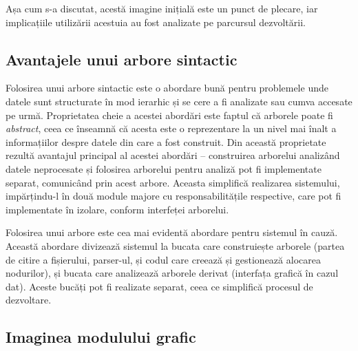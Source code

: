 \documentclass[a4paper,12pt]{report}
\begin{document}
Așa cum s-a discutat, acestă imagine inițială este un punct de plecare,
iar implicațiile utilizării acestuia au fost analizate pe parcursul dezvoltării.

\subsection{Avantajele unui arbore sintactic}

Folosirea unui arbore sintactic este o abordare bună pentru problemele 
unde datele sunt structurate în mod ierarhic și se cere a fi analizate sau cumva accesate pe urmă.
Proprietatea cheie a acestei abordări este faptul că arborele poate fi \textit{abstract},
ceea ce înseamnă că acesta este o reprezentare la un nivel mai înalt a informațiilor despre datele
din care a fost construit.
Din această proprietate rezultă avantajul principal al acestei abordări --
construirea arborelui analizând datele neprocesate și folosirea arborelui
pentru analiză pot fi implementate separat, comunicând prin acest arbore.
Aceasta simplifică realizarea sistemului, impărțindu-l în două module majore cu responsabilitățile respective,
care pot fi implementate în izolare, conform interfeței arborelui.

Folosirea unui arbore este cea mai evidentă abordare pentru sistemul în cauză.
Această abordare divizează sistemul la bucata care construiește arborele
(partea de citire a fișierului, parser-ul, și codul care creează și gestionează alocarea nodurilor),
și bucata care analizează arborele derivat (interfața grafică în cazul dat).
Aceste bucăți pot fi realizate separat, ceea ce simplifică procesul de dezvoltare.

\subsection{Imaginea modulului grafic}
\end{document}
